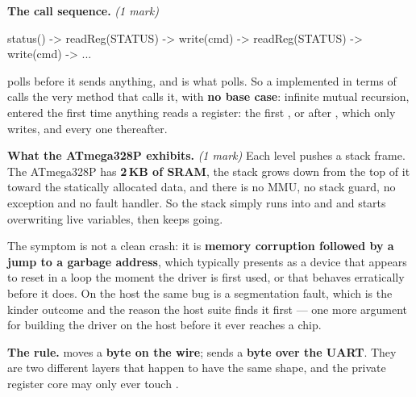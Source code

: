 \textbf{The call sequence.} \textit{(1 mark)}

\begin{console}
status()  ->  readReg(STATUS)  ->  write(cmd)  ->  readReg(STATUS)  ->  write(cmd)  ->  ...
\end{console}

\noindent{} polls  before it sends anything, and  is what
polls. So a  implemented in terms of  calls the very method that calls
it, with \textbf{no base case}: infinite mutual recursion, entered the first time anything reads a
register: the first ,  or  after , which
only writes, and every one thereafter.

\textbf{What the ATmega328P exhibits.} \textit{(1 mark)} Each level pushes a stack frame. The
ATmega328P has \textbf{2\,KB of SRAM}, the stack grows down from the top of it toward the statically
allocated data, and there is no MMU, no stack guard, no exception and no fault handler. So the stack
simply runs into  and  and starts overwriting live variables, then keeps
going.

The symptom is not a clean crash: it is \textbf{memory corruption followed by a jump to a garbage
address}, which typically presents as a device that appears to reset in a loop the moment the driver
is first used, or that behaves erratically before it does. On the host the same bug is a
segmentation fault, which is the kinder outcome and the reason the host suite finds it first --- one
more argument for building the driver on the host before it ever reaches a chip.

\textbf{The rule.}  moves a \textbf{byte on the wire};  sends a
\textbf{byte over the UART}. They are two different layers that happen to have the same shape, and
the private register core may only ever touch .


